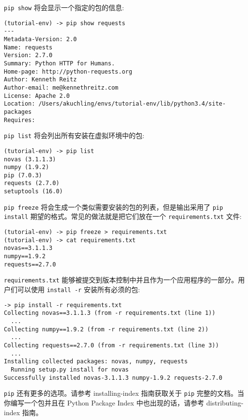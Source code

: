 \texttt{pip show} 将会显示一个指定的包的信息:
\begin{Verbatim}[fontfamily=tt]
(tutorial-env) -> pip show requests
---
Metadata-Version: 2.0
Name: requests
Version: 2.7.0
Summary: Python HTTP for Humans.
Home-page: http://python-requests.org
Author: Kenneth Reitz
Author-email: me@kennethreitz.com
License: Apache 2.0
Location: /Users/akuchling/envs/tutorial-env/lib/python3.4/site-packages
Requires:
\end{Verbatim}
\texttt{pip list} 将会列出所有安装在虚拟环境中的包:
\begin{Verbatim}[fontfamily=tt]
(tutorial-env) -> pip list
novas (3.1.1.3)
numpy (1.9.2)
pip (7.0.3)
requests (2.7.0)
setuptools (16.0)
\end{Verbatim}
\texttt{pip freeze} 将会生成一个类似需要安装的包的列表，但是输出采用了 \texttt{pip install} 期望的格式。常见的做法就是把它们放在一个 \texttt{requirements.txt} 文件:
\begin{Verbatim}[fontfamily=tt]
(tutorial-env) -> pip freeze > requirements.txt
(tutorial-env) -> cat requirements.txt
novas==3.1.1.3
numpy==1.9.2
requests==2.7.0
\end{Verbatim}
\texttt{requirements.txt} 能够被提交到版本控制中并且作为一个应用程序的一部分。用户们可以使用 \texttt{install -r} 安装所有必须的包:
\begin{Verbatim}[fontfamily=tt]
-> pip install -r requirements.txt
Collecting novas==3.1.1.3 (from -r requirements.txt (line 1))
  ...
Collecting numpy==1.9.2 (from -r requirements.txt (line 2))
  ...
Collecting requests==2.7.0 (from -r requirements.txt (line 3))
  ...
Installing collected packages: novas, numpy, requests
  Running setup.py install for novas
Successfully installed novas-3.1.1.3 numpy-1.9.2 requests-2.7.0
\end{Verbatim}

\texttt{pip} 还有更多的选项。请参考 installing-index 指南获取关于 \texttt{pip} 完整的文档。当你编写一个包并且在 Python Package Index 中也出现的话，请参考 distributing-index 指南。